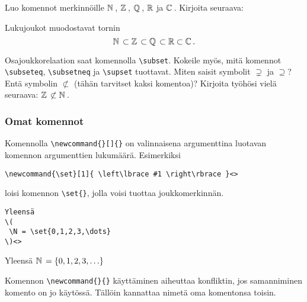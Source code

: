 \begin{fframe}
    \begin{harj}
        Luo komennot merkinnöille \(\mathbb{N}\,\), \(\mathbb{Z}\,\), \(\mathbb{Q}\,\), \(\mathbb{R}\) ja \(\mathbb{C}\,\). Kirjoita seuraava:
        \begin{sample}
            Lukujoukot muodostavat tornin
            \[
                \mathbb{N}\,\subset \mathbb{Z}\,\subset \mathbb{Q}\,\subset \mathbb{R}\subset \mathbb{C}\,.
            \]
        \end{sample}
        Osajoukkorelaation saat komennolla \lstinline-\subset-. Kokeile myös, mitä komennot \lstinline-\subseteq-, \lstinline-\subsetneq- ja  \lstinline-\supset- tuottavat. Miten saisit symbolit \(\supsetneq\) ja  \(\supseteq\)? Entä symbolin \(\not\subset\) (tähän tarvitset kaksi komentoa)?
        \vaihto
        Kirjoita työhösi vielä seuraava: \(\mathbb{Z}\,\not\subset\mathbb{N}\,\).
    \end{harj}
\end{fframe}

\begin{fframe}
    \frametitle{Omat komennot}
    Komennolla \lstinline-\newcommand{}[]{}- on valinnaisena argumenttina luotavan komennon argumenttien lukumäärä. Esimerkiksi
    \begin{lstlisting}
\newcommand{\set}[1]{ \left\lbrace #1 \right\rbrace }<>
    \end{lstlisting}
    loisi komennon \lstinline-\set{}-, jolla voisi tuottaa joukkomerkinnän. 
    \vaihto
    \begin{minipage}{5.3cm}
        \begin{lstlisting}
Yleensä
\(
 \N = \set{0,1,2,3,\dots}
\)<>
        \end{lstlisting}
    \end{minipage}
    \begin{minipage}{4.7cm}
        \begin{serif}
            Yleensä
            \(
                \N = \set{0,1,2,3,\dots}
            \)
        \end{serif}
    \end{minipage}
    \pause
    \vaihto
    Komennon \lstinline-\newcommand{}{}- käyttäminen aiheuttaa konfliktin, jos samanniminen komento on jo käytössä. Tällöin kannattaa nimetä oma komentonsa toisin. 
\end{fframe}

